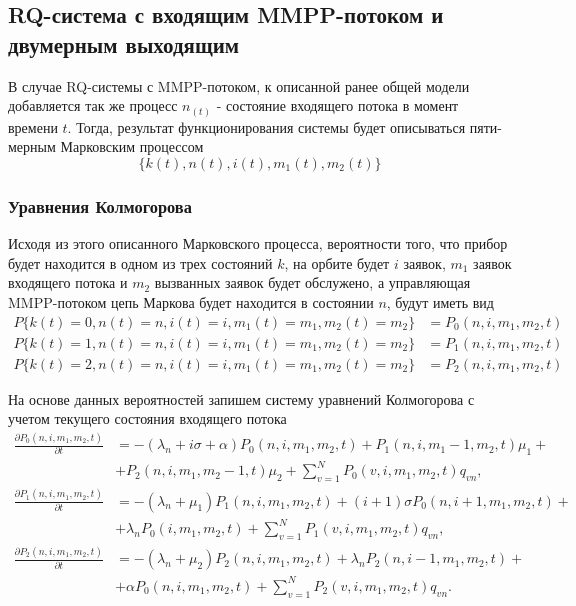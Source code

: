 \subsection{RQ-система с входящим MMPP-потоком и двумерным выходящим} 
В случае RQ-системы с MMPP-потоком, к описанной ранее общей модели добавляется так же процесс $n_(t)$ - состояние входящего потока в момент времени $t$. Тогда, результат функционирования системы будет описываться пяти-мерным Марковским процессом
\begin{equation*}
	\{k(t),n(t),i(t),m_{1}(t),m_{2}(t)\}
\end{equation*}

\subsubsection{Уравнения Колмогорова}

Исходя из этого описанного Марковского процесса, вероятности того, что прибор будет находится в одном из трех состояний $k$, на орбите будет $i$ заявок, $m_{1}$ заявок входящего потока и $m_{2}$ вызванных заявок будет обслужено, а управляющая MMPP-потоком цепь Маркова будет находится в состоянии $n$, будут иметь вид
\begin{equation*}
	\begin{split}
		P\{k(t)=0,n(t)=n,i(t)=i,m_{1}(t)=m_{1},m_{2}(t)=m_{2}\} &=P_{0}(n,i,m_{1},m_{2},t)\\
		P\{k(t)=1,n(t)=n,i(t)=i,m_{1}(t)=m_{1},m_{2}(t)=m_{2}\} &=P_{1}(n,i,m_{1},m_{2},t)\\
		P\{k(t)=2,n(t)=n,i(t)=i,m_{1}(t)=m_{1},m_{2}(t)=m_{2}\} &=P_{2}(n,i,m_{1},m_{2},t)
	\end{split}
\end{equation*} 

На основе данных вероятностей запишем систему уравнений Колмогорова с учетом текущего состояния входящего потока
\begin{equation} \label{kolmogorov_equations_twodim_map}
	\begin{split}
		\frac{{\partial P_{0}(n,i,m_{1},m_{2},t)}}{{\partial t}} &= -(\lambda_{n} + i\sigma + \alpha)P_{0}(n,i,m_{1},m_{2},t) + P_{1}(n,i,m_{1}-1,m_{2},t)\mu_{1} +\\  &+ P_{2}(n,i,m_{1},m_{2}-1,t)\mu_{2} + \sum_{v=1}^{N} P_{0}(v,i,m_{1},m_{2},t)q_{vn},
		\\
		\frac{{\partial P_{1}(n,i,m_{1},m_{2},t)}}{{\partial t}} &= -(\lambda_{n} + \mu_{1})P_{1}(n,i,m_{1},m_{2},t) + (i+1)\sigma P_{0}(n,i+1,m_{1},m_{2},t) +\\ &+ \lambda_{n}  P_{0}(i,m_{1},m_{2},t) + \sum_{v=1}^{N}P_{1}(v,i,m_{1},m_{2},t)q_{vn},
		\\
		\frac{{\partial P_{2}(n,i,m_{1},m_{2},t)}}{{\partial t}} &= -(\lambda_{n} + \mu_{2})P_{2}(n,i,m_{1},m_{2},t) + \lambda_{n} P_{2}(n,i-1,m_{1},m_{2},t)  +\\ &+ \alpha  P_{0}(n,i,m_{1},m_{2},t) +  \sum_{v=1}^{N}P_{2}(v,i,m_{1},m_{2},t)q_{vn}.
	\end{split}
\end{equation}	


